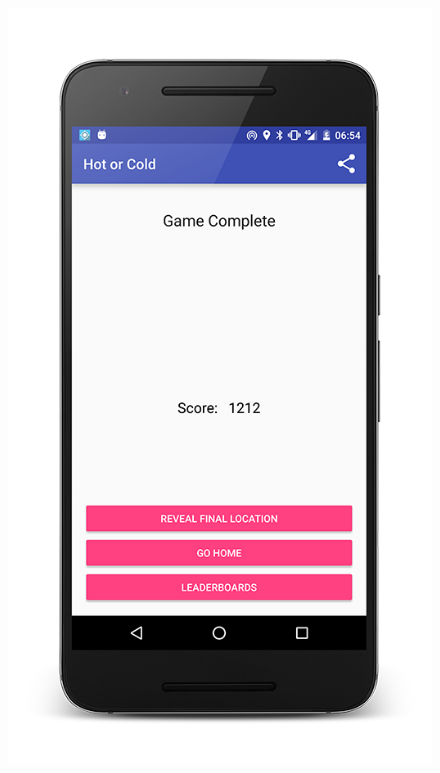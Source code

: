 \documentclass[10pt, a4paper]{article}
\begin{document}
\begin{figure}[!htb]
  \includegraphics[width=1.0\textwidth]{phone_score_3}
  \caption{}
\endminipage
\end{figure}
\end{document}
